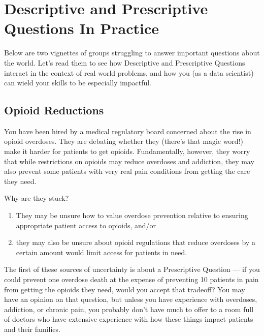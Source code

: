 \documentclass[letterpaper,10pt,english]{jupyterBook}
\begin{document}
\sphinxstepscope


\section{Descriptive and Prescriptive Questions In Practice}
\label{\detokenize{30_questions/06_descriptive_prescriptive_examples:descriptive-and-prescriptive-questions-in-practice}}\label{\detokenize{30_questions/06_descriptive_prescriptive_examples::doc}}
\sphinxAtStartPar
Below are two vignettes of groups struggling to answer important questions about the world. Let’s read them to see how Descriptive and Prescriptive Questions interact in the context of real world problems, and how you (as a data scientist) can wield your skills to be especially impactful.


\subsection{Opioid Reductions}
\label{\detokenize{30_questions/06_descriptive_prescriptive_examples:opioid-reductions}}
\sphinxAtStartPar
You have been hired by a medical regulatory board concerned about the rise in opioid overdoses. They are debating whether they  (there’s that magic word!) make it harder for patients to get opioids. Fundamentally, however, they worry that while restrictions on opioids may reduce overdoses and addiction, they may also prevent some patients with very real pain conditions from getting the care they need.

\sphinxAtStartPar
Why are they stuck?
\begin{enumerate}
%
\item {} 
\sphinxAtStartPar
They may be unsure how to value overdose prevention relative to ensuring appropriate patient access to opioids, and/or

\item {} 
\sphinxAtStartPar
they may also be unsure about  opioid regulations that reduce overdoses by a certain amount would limit access for patients in need.

\end{enumerate}

\sphinxAtStartPar
The first of these sources of uncertainty is about a Prescriptive Question — if you could prevent one overdose death at the expense of preventing 10 patients in pain from getting the opioids they need, would you accept that trade\sphinxhyphen{}off? You may have an opinion on that question, but unless you have experience with overdoses, addiction, or chronic pain, you probably don’t have much to offer to a room full of doctors who have extensive experience with how these things impact patients and their families.
\end{document}
